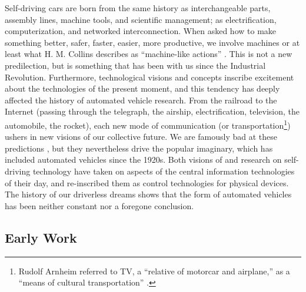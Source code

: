 

Self-driving cars are born from the
same history as interchangeable parts, assembly lines, machine tools,
and scientific management; as electrification, computerization, and
networked interconnection. When asked how to make something better,
safer, faster, easier, more productive, we involve machines or at
least what H. M. Collins describes as ``machine-like actions''
\cite[p. 42]{Collins}. This is not a new predilection, but is
something that has been with us since the Industrial Revolution.
Furthermore, technological visions and concepts inscribe excitement about the
technologies of the present moment, and this tendency has deeply
affected the history of automated vehicle research. From the railroad to the
Internet (passing through the telegraph, the airship, electrification,
television, the automobile, the rocket), each new mode of
communication (or transportation\footnote{Rudolf Arnheim referred to
  TV, a ``relative of motorcar and airplane,'' as a ``means of
  cultural transportation'' \cite[p. 194]{arnheim}.}) ushers in new visions of our
collective future. We are famously bad at these predictions \cite{vanriper}, but they
nevertheless drive the popular imaginary, which has included automated
vehicles since the 1920s. Both visions of and research on self-driving
technology have taken on aspects of the central information
technologies of their day, and re-inscribed them as control
technologies for physical devices. The history of our driverless
dreams shows that the form of automated vehicles has been neither
constant nor a foregone conclusion.

\subsection{Early Work}

